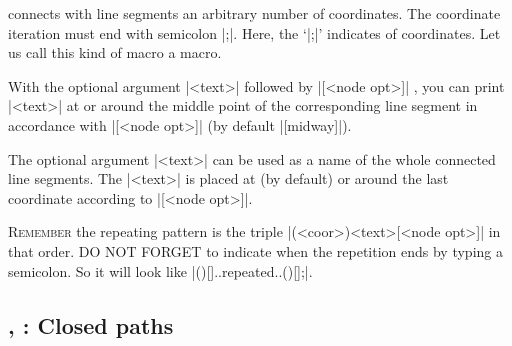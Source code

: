 \icmd{\tzlines} connects with line segments an arbitrary number of coordinates. The coordinate iteration must end with semicolon |;|.
Here, the  `|;|' indicates  of coordinates.
Let us call this kind of macro a  macro. 

\begin{tzcode}{.3}
\end{tzcode}

With the optional argument |{<text>}| followed by |[<node opt>]| , you can print |{<text>}| at or around the middle point of the corresponding line segment in accordance with |[<node opt>]| (by default |[midway]|).

\begin{tzcode}{.3}
\end{tzcode}

The optional argument |{<text>}|  can be used as a name of the whole connected line segments. The |{<text>}| is placed at (by default) or around the last coordinate according to |[<node opt>]|.

\begin{tzcode}{.3}
\end{tzcode}

\textsc{Remember} the repeating pattern is the triple |(<coor>){<text>}[<node opt>]| in that order.
DO NOT FORGET to indicate when the repetition ends by typing a semicolon. So it will look like |(){}[]..repeated..(){}[];|.

\subsection{\protect\cmd{\tzpolygon}, \protect\cmd{\tzpolygon*}: Closed paths}
\label{ssi:tzpolygon}

